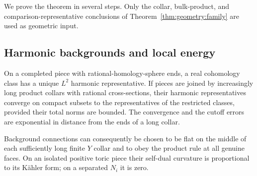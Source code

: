 We prove the theorem in several steps.  Only the collar, bulk-product,
and comparison-representative conclusions of
Theorem~\ref{thm:geometry:family} are used as geometric input.

\subsection{Harmonic backgrounds and local energy}

\begin{lemma}
\label{lem:estimates:hodge}
On a completed piece with rational-homology-sphere ends, a real
cohomology class has a unique $L^2$ harmonic representative.  If pieces
are joined by increasingly long product collars with rational
cross-sections, their harmonic representatives converge on compact
subsets to the representatives of the restricted classes, provided
their total norms are bounded.  The convergence and the cutoff errors
are exponential in distance from the ends of a long collar.

Background connections can consequently be chosen to be flat on the
middle of each sufficiently long finite $Y$ collar and to obey the
product rule at all genuine faces.  On an isolated positive toric
piece their self-dual curvature is proportional to its K\"ahler form;
on a separated $N_i$ it is zero.
\end{lemma}

